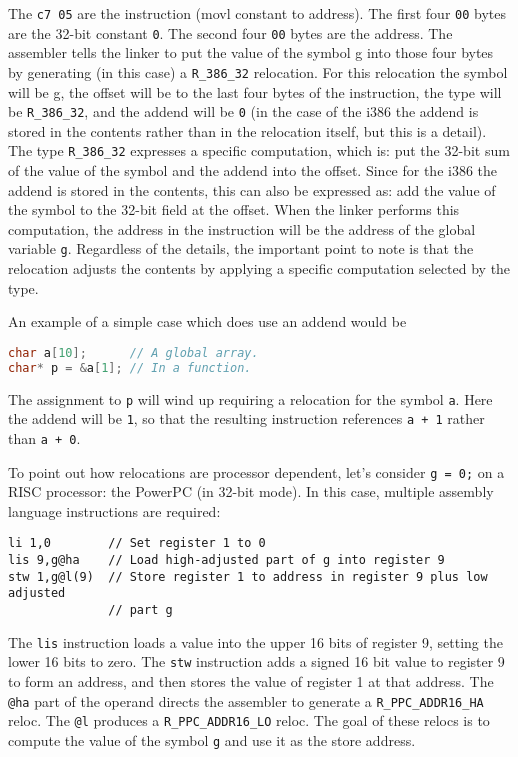 The \texttt{c7 05} are the instruction (movl constant to address). The first
four \texttt{00} bytes are the 32-bit constant \texttt{0}. The second four
\texttt{00} bytes are the address. The assembler tells the linker to put the
value of the symbol g into those four bytes by generating (in this case) a
\texttt{R\_386\_32} relocation. For this relocation the symbol will be g,
the offset will be to the last four bytes of the instruction, the type will
be \texttt{R\_386\_32}, and the addend will be \texttt{0} (in the case of
the i386 the addend is stored in the contents rather than in the relocation
itself, but this is a detail). The type \texttt{R\_386\_32} expresses a
specific computation, which is: put the 32-bit sum of the value of the symbol
and the addend into the offset. Since for the i386 the addend is stored in
the contents, this can also be expressed as: add the value of the symbol to
the 32-bit field at the offset. When the linker performs this computation,
the address in the instruction will be the address of the global variable
\texttt{g}. Regardless of the details, the important point to note is that the
relocation adjusts the contents by applying a specific computation selected by
the type.

An example of a simple case which does use an addend would be

\begin{lstlisting}[language=C]
char a[10];      // A global array.
char* p = &a[1]; // In a function.
\end{lstlisting}

The assignment to \texttt{p} will wind up requiring a relocation for the
symbol \texttt{a}. Here the addend will be \texttt{1}, so that the resulting
instruction references \texttt{a + 1} rather than \texttt{a + 0}.

To point out how relocations are processor dependent, let's consider \texttt{g
= 0;} on a RISC processor: the PowerPC (in 32-bit mode). In this case, multiple
assembly language instructions are required:

\begin{lstlisting}
li 1,0        // Set register 1 to 0
lis 9,g@ha    // Load high-adjusted part of g into register 9
stw 1,g@l(9)  // Store register 1 to address in register 9 plus low adjusted
              // part g
\end{lstlisting}

The \texttt{lis} instruction loads a value into the upper 16 bits of register
9, setting the lower 16 bits to zero. The \texttt{stw} instruction adds a
signed 16 bit value to register 9 to form an address, and then stores the value
of register 1 at that address. The \texttt{@ha} part of the operand directs
the assembler to generate a \texttt{R\_PPC\_ADDR16\_HA} reloc. The \texttt{@l}
produces a \texttt{R\_PPC\_ADDR16\_LO} reloc. The goal of these relocs is to
compute the value of the symbol \texttt{g} and use it as the store address.

